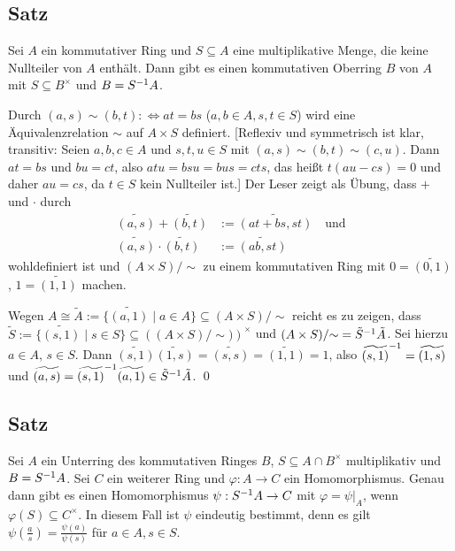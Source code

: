 \subsection{Satz} \label{fixed:2.3.6} Sei $A$ ein kommutativer Ring und $S \subseteq A$ eine multiplikative Menge, die keine Nullteiler von $A$ enthält. Dann gibt es einen kommutativen Oberring $B$ von $A$ mit $S \subseteq B^\times$ und $B = S^{-1} A$.

\proof Durch $(a,s) \sim (b,t) :\iff at = bs$ ($a,b \in A, s,t \in S$) wird eine Äquivalenzrelation $\sim$ auf $A \times S$ definiert. [Reflexiv und symmetrisch ist klar, transitiv: Seien $a,b,c \in A$ und $s,t,u \in S$ mit $(a,s) \sim (b,t) \sim (c,u)$. Dann $at=bs$ und $bu = ct$, also $atu = bsu = bus = cts$, das heißt $t(au-cs) = 0$ und daher $au = cs$, da $t \in S$ kein Nullteiler ist.] Der Leser zeigt als Übung, dass $+$ und $\cdot$ durch
\begin{align*}
	\widetilde{(a,s)} + \widetilde{(b,t)} &:= \widetilde{(at+bs, st)} \quad \text{und}\\
	\widetilde{(a,s)} \cdot \widetilde{(b,t)} &:= \widetilde{(ab,st)}
\end{align*}
wohldefiniert ist und $(A \times S)/{\sim}$ zu einem kommutativen Ring mit $0 = \widetilde{(0,1)}$, $1 = \widetilde{(1,1)}$ machen.

Wegen $A \cong \tilde A := \{\widetilde{(a,1)} \mid a \in A\} \subseteq (A \times S)/\sim$ reicht es zu zeigen, dass $\tilde S := \{\widetilde{(s,1)} \mid s \in S\} \subseteq \left((A \times S)/{\sim})\right)^\times$ und $(A \times S)/{\sim} = \tilde S^{-1} \tilde A$. Sei hierzu $a \in A$, $s \in S$. Dann $\widetilde{(s,1)} \widetilde{(1,s)} = \widetilde{(s,s)} = \widetilde{(1,1)} = 1$, also $\widetilde{(s,1)}^{-1} = \widetilde{(1,s)}$ und $\widetilde{(a,s)} = \widetilde{(s,1)}^{-1} \widetilde{(a,1)} \in \tilde S^{-1} \tilde A$. \qed

\subsection{Satz} \label{fixed:2.3.7} Sei $A$ ein Unterring des kommutativen Ringes $B$, $S \subseteq A \cap B^\times$ multiplikativ und $B = S^{-1} A$. Sei $C$ ein weiterer Ring und $\varphi : A \to C$ ein Homomorphismus. Genau dann gibt es einen Homomorphismus $\psi : S^{-1} A \to C$ mit $\varphi = \psi|_A$, wenn $\varphi(S) \subseteq C^\times$. In diesem Fall ist $\psi$ eindeutig bestimmt, denn es gilt $\psi\left(\frac{a}{s}\right) = \frac{\psi(a)}{\psi(s)}$ für $a \in A, s \in S$.

